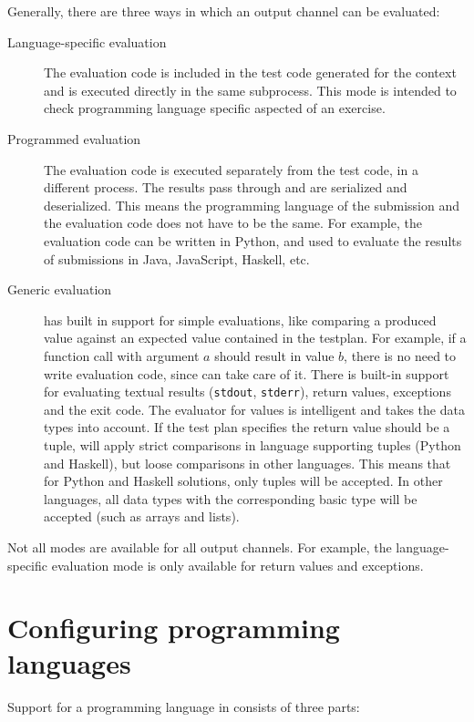 \documentclass[5p,number]{elsarticle}
\begin{document}
    Generally, there are three ways in which an output channel can be evaluated:
    \begin{description}
        \item[Language-specific evaluation] The evaluation code is included in the test code generated for the context and is executed directly in the same subprocess.
        This mode is intended to check programming language specific aspected of an exercise.
        \item[Programmed evaluation] The evaluation code is executed separately from the test code, in a different process.
        The results pass through \tested{} and are serialized and deserialized.
        This means the programming language of the submission and the evaluation code does not have to be the same.
        For example, the evaluation code can be written in Python, and used to evaluate the results of submissions in Java, JavaScript, Haskell, etc.
        \item[Generic evaluation] \tested{} has built in support for simple evaluations, like comparing a produced value against an expected value contained in the testplan.
        For example, if a function call with argument $a$ should result in value $b$, there is no need to write evaluation code, since \tested{} can take care of it.
        There is built-in support for evaluating textual results (\texttt{stdout}, \texttt{stderr}), return values, exceptions and the exit code.
        The evaluator for values is intelligent and takes the data types into account.
        If the test plan specifies the return value should be a tuple, \tested{} will apply strict comparisons in language supporting tuples (Python and Haskell), but loose comparisons in other languages.
        This means that for Python and Haskell solutions, only tuples will be accepted.
        In other languages, all data types with the corresponding basic type will be accepted (such as arrays and lists).
    \end{description}

    Not all modes are available for all output channels.
    For example, the language-specific evaluation mode is only available for return values and exceptions.

    \section{Configuring programming languages}\label{sec:configuring-programming-languages}

    Support for a programming language in \tested{} consists of three parts:
\end{document}
